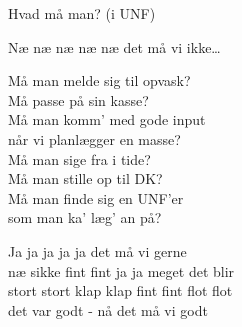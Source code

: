 \begin{song}{Hvad må man? (i UNF)}
  \begin{SBChorus}
    Næ næ næ næ næ det må vi ikke\ldots
  \end{SBChorus}

  \begin{SBVerse}
    Må man melde sig til opvask?\\
    Må passe på sin kasse?\\
    Må man komm’ med gode input\\
    når vi planlægger en masse?\\\medskip
    Må man sige fra i tide?\\
    Må man stille op til DK?\\
    Må man finde sig en UNF’er\\
    som man ka’ læg’ an på?
  \end{SBVerse}

  \begin{SBChorus}
    Ja ja ja ja ja det må vi gerne\\
    næ sikke fint fint ja ja meget det blir\\
    stort stort klap klap fint fint flot flot\\
    det var godt - nå det må vi godt
  \end{SBChorus}
\end{song}